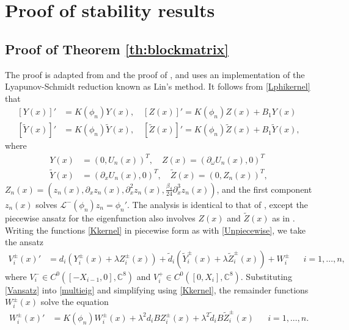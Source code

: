 \documentclass[12pt]{elsarticle}
\def\C{{\mathbb C}}
\def\calL{{\mathcal L}}
\begin{document}
\section{Proof of stability results}\label{sec:proofs}

\subsection{Proof of Theorem \ref{th:blockmatrix}}\label{sec:blockmatrixproof}

The proof is adapted from \cite[Section 3.4]{Manukian} and the proof of \cite[Theorem 2]{Sandstede1998}, and uses an implementation of the Lyapunov-Schmidt reduction known as Lin's method. It follows from \cref{Lphikernel} that
\begin{equation}\label{Kkernel}
\begin{aligned}
[Y(x)]' &= K(\phi_n)Y(x), \quad [Z(x)]' = K(\phi_n)Z(x) + B_1 Y(x) \\
[\tilde{Y}(x)]' &= K(\phi_n)\tilde{Y}(x), \quad [\tilde{Z}(x)]' = K(\phi_n)\tilde{Z}(x) + B_1 \tilde{Y}(x),
\end{aligned}
\end{equation}
where
\begin{equation}
\begin{aligned}
Y(x) &= ( 0, U_n(x) )^T, \quad
Z(x) = ( \partial_\omega U_n(x), 0 )^T \\
\tilde{Y}(x) &= ( \partial_x U_n(x), 0)^T, \quad
\tilde{Z}(x) = ( 0, Z_n(x) )^T,
\end{aligned}
\end{equation}
$Z_n(x) = (z_n(x), \partial_x z_n(x), \partial_x^2 z_n(x), \frac{\beta_4}{24} \partial_x^3 z_n(x))$, and the first component $z_n(x)$ solves $\calL^-(\phi_n)z_n = \phi_n'$. The analysis is identical to that of \cite{Manukian}, except the piecewise ansatz for the eigenfunction also involves $Z(x)$ and $\tilde{Z}(x)$ as in \cite{Parker2020}. Writing the functions \cref{Kkernel} in piecewise form as with \cref{Unpiecewise}, we take the ansatz
\begin{align}\label{Vansatz}
V_i^\pm(x)' &= d_i(Y_i^\pm(x) + \lambda Z_i^\pm(x)) + \tilde{d}_i(\tilde{Y}_i^\pm(x) + \lambda \tilde{Z}_i^\pm(x)) + W_i^\pm && i = 1, \dots, n,
\end{align}
where $V_i^- \in C^0( [-X_{i-1}, 0], \C^8 )$ and $V_i^+ \in C^0( [0, X_i], \C^8 )$. Substituting \cref{Vansatz} into \cref{multieig} and simplifying using \cref{Kkernel}, the remainder functions $W_i^\pm(x)$ solve the equation
\begin{align}\label{Wsolves}
W_i^\pm(x)' &= K(\phi_n)W_i^\pm(x) + \lambda^2 d_i B Z_i^\pm(x) + \lambda^2 \tilde{d}_i B \tilde{Z}_i^\pm(x) && i = 1, \dots, n.
\end{align}
\end{document}

